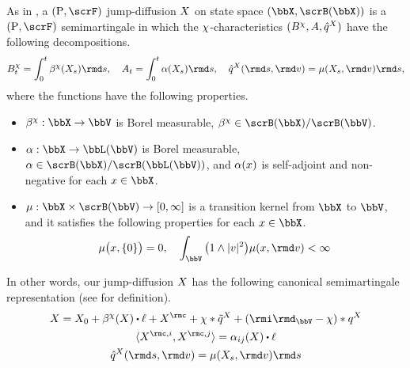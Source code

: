 As in \cite[Definition III.2.18]{jacod2003}, a $(\Prb, \scrF)$ jump-diffusion $X$ on state space $(\stateSpace, \scrB(\stateSpace))$ is a $(\Prb, \scrF)$ semimartingale in which the $\chi$-characteristics $(B^\chi, A, \hat{q}^X)$ have the following decompositions.
\begin{equation}
  \label{eq:jump-diffusion-characteristics}
  B^\trunc_t = \int_0^t \affDrift^\trunc(\X_s) \rmd s, \quad 
  A_t = \int_0^t \affDiff(\X_s) \rmd s, \quad
  \predproj{\jumpMeas^\X}(\rmd s,\rmd\markVar) = \affJump(\X_s, \rmd\markVar) \rmd s,
\end{equation}
where the functions have the following properties.
\begin{itemize}
  \item
    $\affDrift^\trunc: \stateSpace \rightarrow \vecSpace$ is Borel measurable, $\affDrift^\trunc \in \scrB(\stateSpace)/\scrB(\vecSpace)$.
  \item
    $\affDiff: \stateSpace \rightarrow \bbL(\vecSpace)$ is Borel measurable, $\affDiff \in \scrB(\stateSpace)/\scrB(\bbL(\vecSpace))$, and $\alpha(x)$ is self-adjoint and non-negative for each $\stateVar \in \stateSpace$.
  \item
    $\affJump: \stateSpace \times \scrB(\vecSpace) \rightarrow [0,\infty]$ is a transition kernel from $\stateSpace$ to $\vecSpace$, and it satisfies the following properties for each $\stateVar \in \stateSpace$.
    \begin{equation}
      \label{eq:affJump-conditions}
      \affJump\big(\stateVar, \{0\}\big) = 0, \quad \int_\vecSpace \big( 1 \wedge |\markVar|^2\big) \affJump(\stateVar, \rmd\markVar) < \infty
    \end{equation}
\end{itemize}
In other words, our jump-diffusion $X$ has the following canonical semimartingale representation (see \cite[Theorem II.2.34]{jacod2003} for definition).
\begin{equation}
  \label{eq:jump-diffusion-canonical}
  \begin{gathered}
    \X = \X_0 + \affDrift^\trunc(\X) \shortInt \leb + \X^\rmc +  \trunc \ast \compensate{\jumpMeas^\X} + (\id_\vecSpace - \trunc) \ast \jumpMeas^\X \\
    \prj{\X^{\rmc,i}}{\X^{\rmc,j}} = \affDiff_{ij}(\X) \shortInt \leb \\
    \predproj{\jumpMeas^\X}(\rmd s, \rmd\markVar) = \affJump(\X_s, \rmd\markVar) \rmd s
  \end{gathered}
\end{equation}

